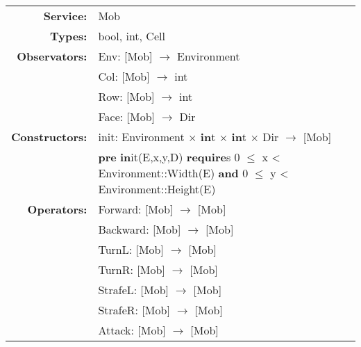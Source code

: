 
\begin{tabular}{rl}

\textbf{Service:} &	Mob\\
\textbf{Types:}& bool, int, Cell\\ 
\textbf{Observators:} & 
Env: [Mob] $\rightarrow$ Environment\\
&
Col: [Mob] $\rightarrow$ int\\
&
Row: [Mob] $\rightarrow$ int\\
&
Face: [Mob] $\rightarrow$ Dir\\
\textbf{Constructors:} & 
init: Environment $\times$ \textbf{in}t $\times$ \textbf{in}t $\times$ Dir $\rightarrow$ [Mob]\\
&
\quad\textbf{pre} \textbf{in}it(E,x,y,D) \textbf{require}s 0 $\leq$ x < Environment::Width(E)
\textbf{and} 0 $\leq$ y < Environment::Height(E)\\

\textbf{Operators:} &
Forward: [Mob] $\rightarrow$ [Mob]\\
&
Backward: [Mob] $\rightarrow$ [Mob]\\
&
TurnL: [Mob] $\rightarrow$ [Mob]\\
&
TurnR: [Mob] $\rightarrow$ [Mob]\\
&
StrafeL: [Mob] $\rightarrow$ [Mob]\\
&
StrafeR: [Mob] $\rightarrow$ [Mob]\\
&
Attack: [Mob] $\rightarrow$ [Mob]\\
\end{tabular}

